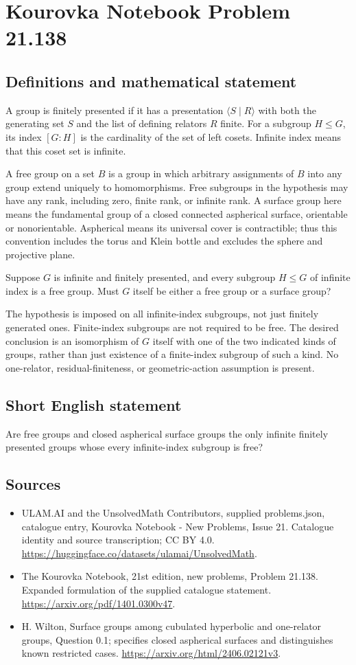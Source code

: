 \documentclass[11pt,a4paper]{article}
\begin{document}
\section*{Kourovka Notebook Problem 21.138}\label{statement}

\subsection{Definitions and mathematical statement}
A group is finitely presented if it has a presentation $\langle S\mid R\rangle$ with both the generating set $S$ and the list of defining relators $R$ finite. For a subgroup $H\le G$, its index $[G:H]$ is the cardinality of the set of left cosets. Infinite index means that this coset set is infinite.

A free group on a set $B$ is a group in which arbitrary assignments of $B$ into any group extend uniquely to homomorphisms. Free subgroups in the hypothesis may have any rank, including zero, finite rank, or infinite rank. A surface group here means the fundamental group of a closed connected aspherical surface, orientable or nonorientable. Aspherical means its universal cover is contractible; thus this convention includes the torus and Klein bottle and excludes the sphere and projective plane.

Suppose $G$ is infinite and finitely presented, and every subgroup $H\le G$ of infinite index is a free group. Must $G$ itself be either a free group or a surface group?

The hypothesis is imposed on all infinite-index subgroups, not just finitely generated ones. Finite-index subgroups are not required to be free. The desired conclusion is an isomorphism of $G$ itself with one of the two indicated kinds of groups, rather than just existence of a finite-index subgroup of such a kind. No one-relator, residual-finiteness, or geometric-action assumption is present.
\subsection{Short English statement}
Are free groups and closed aspherical surface groups the only infinite finitely presented groups whose every infinite-index subgroup is free?
\subsection{Sources}
\begin{itemize}
\item[S1] ULAM.AI and the UnsolvedMath Contributors, supplied problems.json, catalogue entry, Kourovka Notebook - New Problems, Issue 21. Catalogue identity and source transcription; CC BY 4.0.
\url{https://huggingface.co/datasets/ulamai/UnsolvedMath}.
\item[S2] The Kourovka Notebook, 21st edition, new problems, Problem 21.138. Expanded formulation of the supplied catalogue statement.
\url{https://arxiv.org/pdf/1401.0300v47}.
\item[S3] H. Wilton, Surface groups among cubulated hyperbolic and one-relator groups, Question 0.1; specifies closed aspherical surfaces and distinguishes known restricted cases.
\url{https://arxiv.org/html/2406.02121v3}.
\end{itemize}
\end{document}
